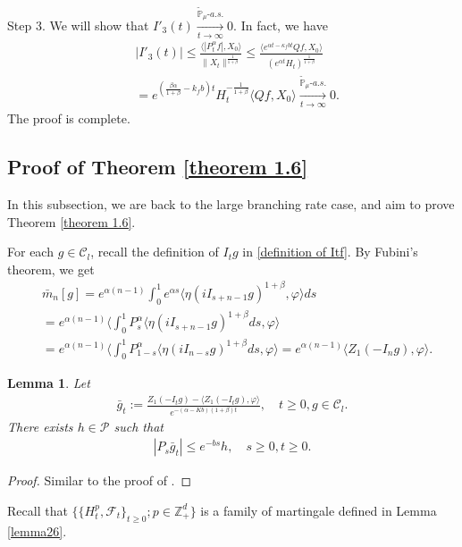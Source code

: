 \documentclass[12pt,a4paper]{amsart}
\theoremstyle{plain}
\newtheorem{lem}[thm]{Lemma}
\theoremstyle{definition}
\numberwithin{equation}{section}
\begin{document}
	Step 3. We will show that $I'_3(t) \xrightarrow[t\to \infty]{\tilde {\mathbb P}_\mu \text{-} a.s.} 0$.
In fact, we have
\begin{equation}\begin{split}
	&|I'_3(t)|
     \leq \frac{\langle |P^\alpha_tf|,X_0\rangle}{\|X_t\|^{\frac{1}{1+\beta}}}
	\leq \frac{\langle e^{\alpha t - \kappa_f b t}Qf,X_0\rangle}{(e^{\alpha t} H_t)^{\frac{1}{1+\beta}}}
	\\& = e^{(\frac{\beta \alpha }{1+\beta} - k_fb)t} H_t^{-\frac{1}{1+\beta}} \langle Qf,X_0\rangle
	\xrightarrow[t\to \infty]{\tilde {\mathbb P}_\mu \text{-} a.s.} 0.
\end{split}\end{equation}
	The proof is complete.
\subsection{Proof of Theorem \ref{theorem 1.6}}\label{large rate again}
In this subsection, we are back to the large branching rate case, and aim to prove Theorem \ref{theorem 1.6}.

For each $g\in \mathcal{C}_l$, recall the definition of $I_tg$ in \eqref{definition of Itf}.
By Fubini's theorem, we get
\begin{align}\label{equ: transform of mn}
    &\bar{m}_n[g]=e^{\alpha(n-1)}\int_0^1 e^{\alpha s}\langle \eta(iI_{s+n-1}g)^{1+\beta}, \varphi\rangle ds\\
    &=e^{\alpha(n-1)}\langle \int_0^1 P_s^{\alpha}\langle \eta(iI_{s+n-1}g)^{1+\beta}ds, \varphi\rangle\\
    &=e^{\alpha(n-1)}\langle \int_0^1 P_{1-s}^{\alpha}\langle \eta(iI_{n-s}g)^{1+\beta}ds, \varphi\rangle=e^{\alpha(n-1)}\langle Z_1(-I_ng), \varphi\rangle.
\end{align}
\begin{lem}\label{control of gn}
    Let
    \begin{align}
        \bar{g}_t:=\frac{Z_1(-I_tg)-\langle Z_1(-I_tg),\varphi\rangle}{e^{-(\alpha-Kb)(1+\beta)t}},\quad t\geq 0, g\in \mathcal{C}_l.
    \end{align}
    There exists $h\in \mathcal{P}$ such that
    \begin{align}
        |P_s\bar{g}_t|\leq e^{-bs}h,\quad s\geq 0, t\geq 0.
    \end{align}
\end{lem}
\begin{proof}
    Similar to the proof of \cite[Lemma 2.8]{MM}.
\end{proof}
Recall that $\Big\{\{H^p_t, \mathscr{F}_t\}_{t\geq 0};p\in \mathbb{Z}_+^d\Big\}$ is a family of martingale defined in Lemma \ref{lemma26}.
\end{document}
